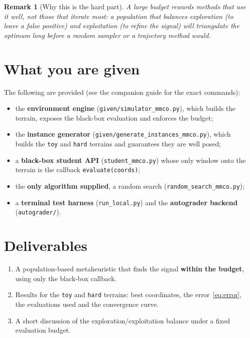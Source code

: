 \documentclass[11pt,a4paper]{article}
\newtheorem{remark}{Remark}
\begin{document}
\begin{remark}[Why this is the hard part]
A large budget rewards methods that \emph{use it well}, not those that iterate
most: a population that balances exploration (to leave a false positive) and
exploitation (to refine the signal) will triangulate the optimum long before a
random sampler or a trajectory method would.
\end{remark}

\section{What you are given}

The following are provided (see the companion guide for the exact commands):

\begin{itemize}
  \item the \textbf{environment engine} (\texttt{given/simulator\_mmco.py}),
  which builds the terrain, exposes the black-box evaluation and enforces the
  budget;
  \item the \textbf{instance generator}
  (\texttt{given/generate\_instances\_mmco.py}), which builds the \texttt{toy}
  and \texttt{hard} terrains and guarantees they are well posed;
  \item a \textbf{black-box student API} (\texttt{student\_mmco.py}) whose only
  window onto the terrain is the callback \texttt{evaluate(coords)};
  \item the \textbf{only algorithm supplied}, a random search
  (\texttt{random\_search\_mmco.py});
  \item a \textbf{terminal test harness} (\texttt{run\_local.py}) and the
  \textbf{autograder backend} (\texttt{autograder/}).
\end{itemize}

\section{Deliverables}

\begin{enumerate}
  \item A population-based metaheuristic that finds the signal \textbf{within the
  budget}, using only the black-box callback.
  \item Results for the \texttt{toy} and \texttt{hard} terrains: best coordinates,
  the error~\eqref{eq:error}, the evaluations used and the convergence curve.
  \item A short discussion of the exploration/exploitation balance under a fixed
  evaluation budget.
\end{enumerate}
\end{document}
